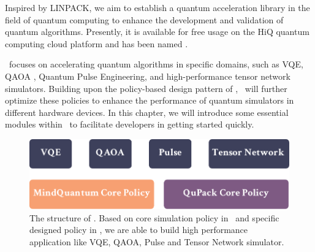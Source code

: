 



Inspired by LINPACK, we aim to establish a quantum acceleration library in the field of quantum computing to enhance the development and validation of quantum algorithms. Presently, it is available for free usage on the HiQ quantum computing cloud platform and has been named \QuPack.

\QuPack\ focuses on accelerating quantum algorithms in specific domains, such as VQE, QAOA , Quantum Pulse Engineering, and high-performance tensor network simulators. Building upon the policy-based design pattern of \MindQuantum, \QuPack\ will further optimize these policies to enhance the performance of quantum simulators in different hardware devices. In this chapter, we will introduce some essential modules within \QuPack\ to facilitate developers in getting started quickly.

\begin{figure}[ht]
    \centering
    \includegraphics[scale=0.5]{./images/6_qupack_layer.pdf}
    \captionsetup{justification=raggedright,singlelinecheck=false}
    \caption{\label{6_qupack_layer} The structure of \QuPack. Based on core simulation policy in \MindQuantum\ and specific designed policy in \QuPack, we are able to build high performance application like VQE, QAOA, Pulse and Tensor Network simulator.}
\end{figure}
